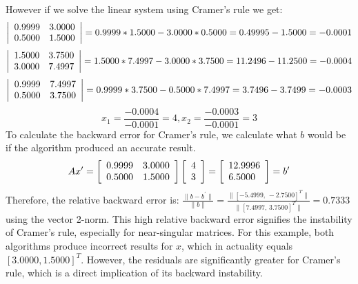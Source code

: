\documentclass[12pt,letterpaper,reqno]{amsart}
\begin{document}
\begin{enumerate}
\begin{flushleft}
However if we solve the linear system using Cramer's rule we get:
$$\left|\begin{array} { l l } { 0.9999 } & { 3.0000 } \\ { 0.5000 } & { 1.5000 } \end{array}\right| = 0.9999 * 1.5000 - 3.0000 * 0.5000 = 0.49995 - 1.5000 = -0.0001$$
$$\left|\begin{array} { l l } { 1.5000 } & { 3.7500 } \\ { 3.0000 } & { 7.4997 } \end{array}\right| = 1.5000 * 7.4997 - 3.0000 * 3.7500 = 11.2496 - 11.2500 = -0.0004$$
$$\left|\begin{array} { l l } { 0.9999 } & { 7.4997 } \\ { 0.5000 } & { 3.7500 } \end{array}\right| = 0.9999 * 3.7500 - 0.5000 * 7.4997 = 3.7496 - 3.7499 = -0.0003$$
$$x_1 = \frac{-0.0004}{-0.0001} = 4, x_2 = \frac{-0.0003}{-0.0001} = 3$$
To calculate the backward error for Cramer's rule, we calculate what $b$ would be if the algorithm produced an accurate result.
$$Ax^\prime = \left[\begin{array} { l l } { 0.9999 } & { 3.0000 } \\ { 0.5000 } & { 1.5000 } \end{array}\right]\left[\begin{array} { l } {4} \\ {3} \end{array}\right] = \left[\begin{array} { l } {12.9996} \\ {6.5000} \end{array}\right] = b^\prime$$
Therefore, the relative backward error is: $\frac{\|b - b^\prime \|}{\|b\|} = \frac{\|[-5.4999,\, -2.7500]^T\|}{\|[7.4997,\, 3.7500]^T\|} = 0.7333$ using the vector 2-norm. This high relative backward error signifies the instability of Cramer's rule, especially for near-singular matrices. For this example, both algorithms produce incorrect results for $x$, which in actuality equals $[3.0000, 1.5000]^T$. However, the residuals are significantly greater for Cramer's rule, which is a direct implication of its backward instability.
\end{flushleft}


\end{enumerate}
\end{document}
